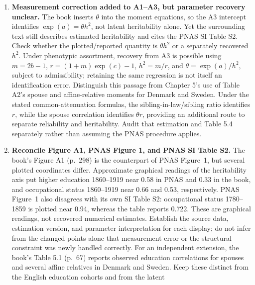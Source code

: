 \documentclass[12pt]{article}
\renewenvironment{itemize}{\begin{enumerate}}{\end{enumerate}}
\begin{document}
\begin{itemize}
factor $(1+r)/(1+m)$ from different attenuation factors? The same question
arises for the single-grandparent moment relative to the aunt/uncle moment.
Specify whether reliability varies by historical generation or by the
number of generations separating a pair, derive the resulting pair-level
attenuation factors, and establish what additional restrictions or moments
would separate measurement error from the effects of $r$ versus $m$.
\item \textbf{Measurement correction added to A1--A3, but parameter recovery unclear.}
The book inserts $\theta$ into the moment equations, so the A3 intercept
identifies $\exp(a)=\theta h^2$, not latent heritability alone. Yet the
surrounding text still describes estimated heritability and cites the PNAS
SI Table S2. Check whether the plotted/reported quantity is $\theta h^2$
or a separately recovered $h^2$. Under phenotypic assortment, recovery
from A3 is possible using $m=2b-1$, $r=(1+m)\exp(c)-1$, $h^2=m/r$,
and $\theta=\exp(a)/h^2$, subject to admissibility; retaining the same
regression is not itself an identification error. Distinguish this
passage from Chapter 5's use of Table A2's spouse and affine-relative
moments for Denmark and Sweden. Under the stated common-attenuation
formulas, the sibling-in-law/sibling ratio identifies $r$, while the
spouse correlation identifies $\theta r$, providing an additional route
to separate reliability and heritability. Audit that estimation and
Table 5.4 separately rather than assuming the PNAS procedure applies.
\item \textbf{Reconcile Figure A1, PNAS Figure 1, and PNAS SI Table S2.}
The book's Figure A1 (p.~298) is the counterpart of PNAS Figure~1,
but several plotted coordinates differ. Approximate graphical readings
of the heritability axis put higher education 1860--1919 near 0.58 in
PNAS and 0.33 in the book, and occupational status 1860--1919 near
0.66 and 0.53, respectively. PNAS Figure~1 also disagrees with its own
SI Table S2: occupational status 1780--1859 is plotted near 0.94,
whereas the table reports 0.722. These are graphical readings, not
recovered numerical estimates. Establish the source data, estimation
version, and parameter interpretation for each display; do not infer
from the changed points alone that measurement error or the structural
constraint was newly handled correctly. For an independent extension,
the book's Table 5.1 (p.~67) reports observed education correlations for
spouses and several affine relatives in Denmark and Sweden. Keep these
distinct from the English education cohorts and from the latent

\end{itemize}
\end{document}
